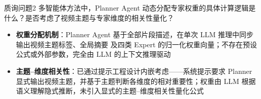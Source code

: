 \begin{frame}
  \begin{block}{质询问题2}
    多智能体方法中，Planner Agent 动态分配专家权重的具体计算逻辑是什么？是否考虑了视频主题与专家维度的相关性量化？
  \end{block}
  \vfill
  \begin{itemize}
    \item \textbf{权重分配机制}：Planner Agent 基于全部片段描述，在单次 LLM 推理中同步输出视频主题标签、全局摘要 及四类 Expert 的归一化权重向量；不存在预设公式或外部参数，完全由 LLM 的上下文推理驱动
    \item \textbf{主题--维度相关性}：已通过提示工程设计内嵌考虑——系统提示要求 Planner 显式输出视频主题，并基于主题判断各维度的相对重要性；权重由 LLM 根据语义理解隐式推断，未引入显式的主题--维度相关性量化公式
  \end{itemize}
  \vfill
\end{frame}
